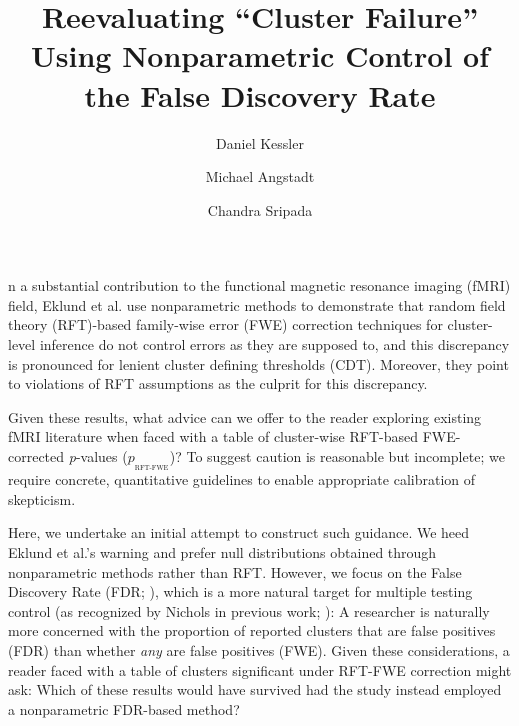\documentclass[9pt,twocolumn,twoside]{pnas-new}
\title{Reevaluating ``Cluster Failure'' Using Nonparametric Control of the False Discovery Rate}
\author[a,1,2]{Daniel Kessler}
\author[a,1]{Michael Angstadt}
\author[a,1]{Chandra Sripada}
\affil[a]{Department of Psychiatry, University of Michigan, Ann Arbor}
\newcommand{\subtext}[2]{
#1_{_{\text{#2}}}
}
\begin{document}
\verticaladjustment{-2pt}

\maketitle
\thispagestyle{firststyle}





n a substantial contribution to the functional magnetic resonance imaging (fMRI) field, Eklund et al. \cite{eklund_cluster_2016} use nonparametric methods to demonstrate that random field theory (RFT)-based family-wise error (FWE) correction techniques for cluster-level inference do not control errors as they are supposed to, and this discrepancy is pronounced for lenient cluster defining thresholds (CDT). 
Moreover, they point to violations of RFT assumptions as the culprit for this discrepancy.

Given these results, what advice can we offer to the reader exploring existing fMRI literature when faced with a table of cluster-wise RFT-based FWE-corrected \textit{p}-values ($\subtext{p}{RFT-FWE}$)? 
To suggest caution is reasonable but incomplete; we require concrete, quantitative guidelines to enable appropriate calibration of skepticism.

Here, we undertake an initial attempt to construct such guidance.
We heed Eklund et al.'s warning and prefer null distributions obtained through nonparametric methods rather than RFT.
However, we focus on the False Discovery Rate (FDR; \cite{benjamini_controlling_1995}), which is a more natural target for multiple testing control (as recognized by Nichols in previous work; \cite{genovese_thresholding_2002}):
A researcher is naturally more concerned with the proportion of reported clusters that are false positives (FDR) than whether \textit{any} are false positives (FWE).
Given these considerations, a reader faced with a table of clusters significant under RFT-FWE correction might ask: Which of these results would have survived had the study instead employed a nonparametric FDR-based method?
\end{document}
